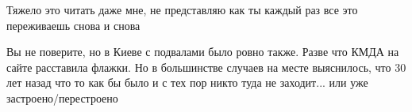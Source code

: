 
 
 
 
 

\qqSecCmt


Тяжело это читать даже мне, не представляю как ты каждый раз все это
переживаешь снова и снова


Вы не поверите, но в Киеве с подвалами было ровно также. Разве что КМДА на
сайте расставила флажки. Но в большинстве случаев на месте выяснилось, что 30
лет назад что то как бы было и с тех пор никто туда не заходит... или уже
застроено/перестроено
